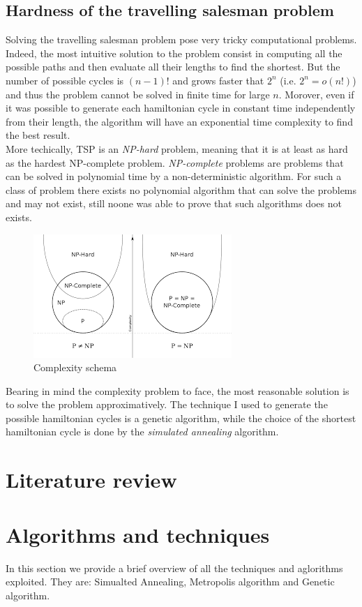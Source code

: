 \documentclass{article}
\begin{document}
\subsection{Hardness of the travelling salesman problem}
Solving the travelling salesman problem pose very tricky computational problems. Indeed, the most intuitive solution to the problem consist in computing all the possible paths and then evaluate all their lengths to find the shortest. But the number of possible cycles is $(n-1)!$ and grows faster that $2^n$ (i.e. $2^n = o(n!)$) and thus the problem cannot be solved in finite time for large $n$. Morover, even if it was possible to generate each hamiltonian cycle in constant time independently from their length, the algorithm will have an exponential time complexity to find the best result.  \\
More techically, TSP is an \textit{NP-hard} problem, meaning that it is at least as hard as the hardest NP-complete problem. \textit{NP-complete} problems are problems that can be solved in polynomial time by a non-deterministic algorithm. For such a class of problem there exists no polynomial algorithm that can solve the problems and may not exist, still noone was able to prove that such algorithms does not exists.
\begin{figure}[H]
\includegraphics[scale=0.25]{complexity_classes.png} 
\centering
\caption{Complexity schema}
\end{figure}
\noindent Bearing in mind the complexity problem to face, the most reasonable solution is to solve the problem approximatively. The technique I used to generate the possible hamiltonian cycles is a genetic algorithm, while the choice of the shortest hamiltonian cycle is done by the \textit{simulated annealing} algorithm.

\section{Literature review}

\section{Algorithms and techniques}
In this section we provide a brief overview of all the techniques and aglorithms exploited. They are: Simualted Annealing, Metropolis algorithm and Genetic algorithm.
\end{document}
